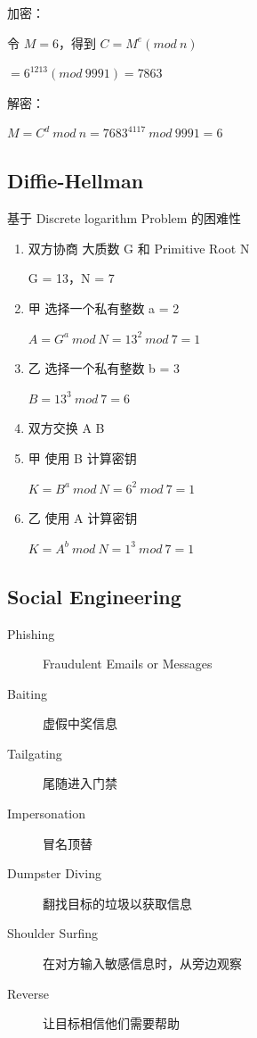 \documentclass[11pt,journal,compsoc]{IEEEtran}
\begin{document}
加密：

令 $M = 6$，得到 $C = M^e (mod ~n)$

$= 6^{1213} (mod ~9991) = 7863$

解密：

$M = C^d ~mod ~n = 7683^{4117} ~mod ~9991 = 6$


\subsection{Diffie-Hellman}

基于 Discrete logarithm Problem 的困难性

\begin{enumerate}
    \item 双方协商 大质数 G 和 Primitive Root N

    G = 13，N = 7

    \item 甲 选择一个私有整数 a = 2

    $A = G^a ~mod ~N = 13^2 ~mod ~7 = 1$

    \item 乙 选择一个私有整数 b = 3

    $B = 13^3 ~mod ~7 = 6$

    \item 双方交换 A B

    \item 甲 使用 B 计算密钥

    $K = B^a ~mod ~N = 6^2 ~mod ~7 = 1$

    \item 乙 使用 A 计算密钥

    $K = A^b ~mod ~N = 1^3 ~mod ~7 = 1$
\end{enumerate}


\subsection{Social Engineering}

\begin{description}
    \item[Phishing] Fraudulent Emails or Messages

    \item[Baiting] 虚假中奖信息

    \item[Tailgating] 尾随进入门禁

    \item[Impersonation] 冒名顶替

    \item[Dumpster Diving] 翻找目标的垃圾以获取信息

    \item[Shoulder Surfing] 在对方输入敏感信息时，从旁边观察

    \item[Reverse] 让目标相信他们需要帮助
\end{description}
\end{document}
